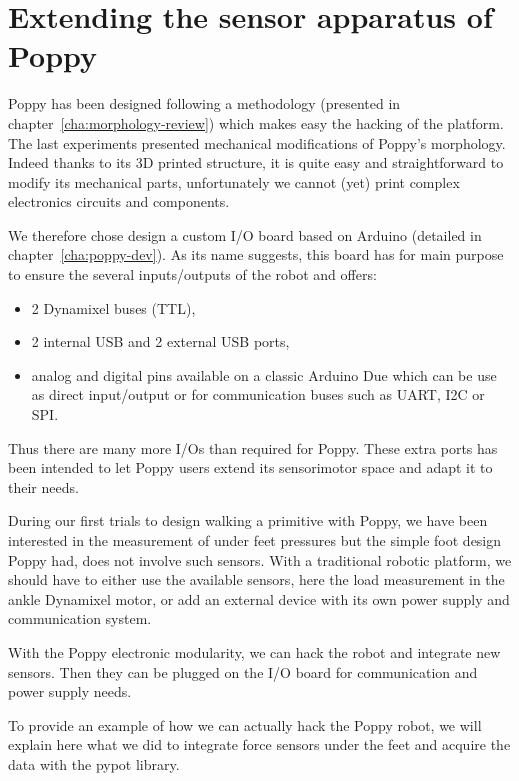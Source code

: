 
\newpage
\section{Extending the sensor apparatus of Poppy} %
\label{sec:morphology-adding-sensors}

Poppy has been designed following a methodology (presented in chapter~\ref{cha:morphology-review}) which makes easy the hacking of the platform.
The last experiments presented mechanical modifications of Poppy's morphology. Indeed thanks to its 3D printed structure, it is quite easy and straightforward to modify its mechanical parts, unfortunately we cannot (yet) print complex electronics circuits and components.

We therefore chose design a custom I/O board based on Arduino (detailed in chapter~\ref{cha:poppy-dev}). As its name suggests, this board has for main purpose to ensure the several inputs/outputs of the robot and offers:
\begin{itemize}
    \item 2 Dynamixel buses (TTL),
    \item 2 internal USB and 2 external USB ports,
    \item analog and digital pins available on a classic Arduino Due which can be use as direct input/output or for communication buses such as UART, I2C or SPI.
\end{itemize}
Thus there are many more I/Os than required for Poppy. These extra ports has been intended to let Poppy users extend its sensorimotor space and adapt it to their needs.


During our first trials to design walking a primitive with Poppy, we have been interested in the measurement of under feet pressures but the simple foot design Poppy had, does not involve such sensors. With a traditional robotic platform, we should have to either use the available sensors, here the load measurement in the ankle Dynamixel motor, or add an external device with its own power supply and communication system.

With the Poppy electronic modularity, we can hack the robot and integrate new sensors. Then they can be plugged on the I/O board for communication and power supply needs.

To provide an example of how we can actually hack the Poppy robot, we will explain here what we did to integrate force sensors under the feet and acquire the data with the pypot library.


